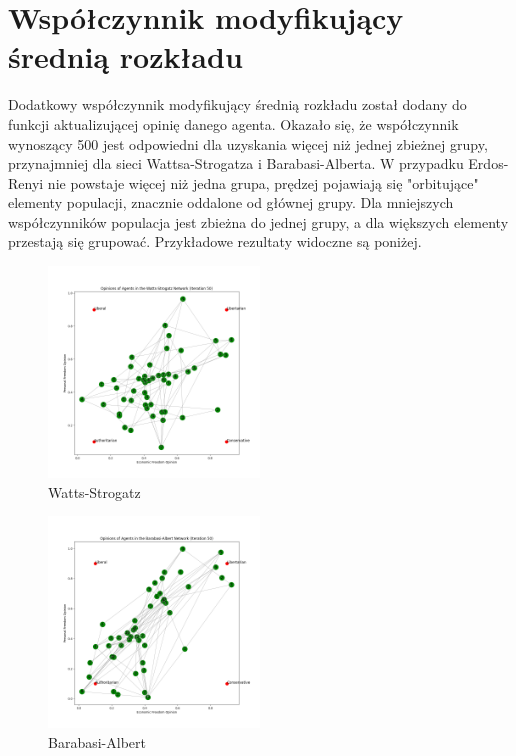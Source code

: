 \documentclass{wfiisul}
\begin{document}
\section{Współczynnik modyfikujący średnią rozkładu}

Dodatkowy współczynnik modyfikujący średnią rozkładu został dodany do funkcji aktualizującej opinię danego agenta. 
Okazało się, że współczynnik wynoszący 500 jest odpowiedni dla uzyskania więcej niż jednej zbieżnej grupy, przynajmniej dla sieci Wattsa-Strogatza i Barabasi-Alberta. 
W przypadku Erdos-Renyi nie powstaje więcej niż jedna grupa, prędzej pojawiają się "orbitujące" elementy populacji, znacznie oddalone od głównej grupy. 
Dla mniejszych współczynników populacja jest zbieżna do jednej grupy, a dla większych elementy przestają się grupować. 
Przykładowe rezultaty widoczne są poniżej. 

\begin{figure}
  \centering
  \includegraphics[width=0.5\textwidth]{img/Watts-Strogatz.png}
  \caption{Watts-Strogatz}
  \label{fig:Watts-Strogatz}
\end{figure}

\begin{figure}
  \centering
  \includegraphics[width=0.5\textwidth]{img/Barabasi-Albert.png}
  \caption{Barabasi-Albert}
  \label{fig:Barabasi-Albert}
\end{figure}
\end{document}
